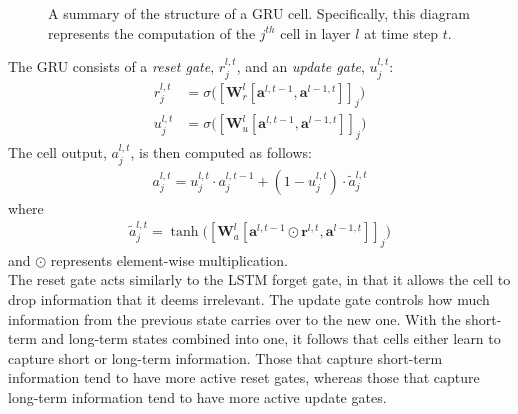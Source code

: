 \documentclass[a4paper, 12pt]{report}
\newcommand{\tit}[1]{\textit{#1}}
\begin{document}
\begin{figure}[h]
\caption{A summary of the structure of a GRU cell. Specifically, this diagram represents the computation of the $j^{th}$ cell in layer $l$ at time step $t$.}
\label{fig:gru_structure}
\end{figure}

The GRU consists of a \tit{reset gate}, $r_j^{l, t}$, and an \tit{update gate}, $u_j^{l, t}$:
\begin{align}
	r_j^{l, t} &= \sigma \big( [\mathbf{W}_r^l [\mathbf{a}^{l, t - 1}, \mathbf{a}^{l - 1, t}]]_j \big) \\
	u_j^{l, t} &= \sigma \big( [\mathbf{W}_u^l [\mathbf{a}^{l, t - 1}, \mathbf{a}^{l - 1, t}]]_j \big)
\end{align}
The cell output, $a_j^{l, t}$, is then computed as follows:
\begin{gather}
	a_j^{l, t} = u_j^{l, t} \cdot a_j^{l, t - 1} + (1 - u_j^{l, t}) \cdot \tilde{a}_j^{l, t}
\end{gather}
where
\begin{gather}
	\tilde{a}_j^{l, t} = \tanh \big( [\mathbf{W}_a^l [\mathbf{a}^{l, t - 1} \odot \mathbf{r}^{l, t}, \mathbf{a}^{l - 1, t}]]_j \big)
\end{gather}
and $\odot$ represents element-wise multiplication. \\

The reset gate acts similarly to the LSTM forget gate, in that it allows the cell to drop information that it deems irrelevant. The update gate controls how much information from the previous state carries over to the new one. With the short-term and long-term states combined into one, it follows that cells either learn to capture short or long-term information. Those that capture short-term information tend to have more active reset gates, whereas those that capture long-term information tend to have more active update gates.
\end{document}
